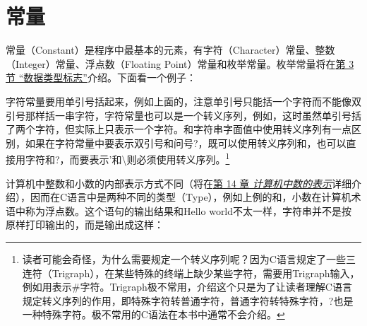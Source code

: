 
\section{常量}
%
常量（Constant）是程序中最基本的元素，有字符（Character）常量、整数（Integer）常量、浮点数（Floating Point）常量和枚举常量。枚举常量将在\hyperlink{db.ch07s03.id2731288}{第 3 节 “数据类型标志”}介绍。下面看一个例子：




字符常量要用单引号括起来，例如上面的，注意单引号只能括一个字符而不能像双引号那样括一串字符，字符常量也可以是一个转义序列，例如，这时虽然单引号括了两个字符，但实际上只表示一个字符。和字符串字面值中使用转义序列有一点区别，如果在字符常量中要表示双引号\BookQuoteChar{}和问号?，既可以使用转义序列\BookCode{\textbackslash{}\BookQuoteChar{}}和，也可以直接用字符\BookQuoteChar{}和?，而要表示'和\textbackslash{}则必须使用转义序列。\footnote[2]{读者可能会奇怪，为什么需要规定一个转义序列呢？因为C语言规定了一些三连符（Trigraph），在某些特殊的终端上缺少某些字符，需要用Trigraph输入，例如用表示\#字符。Trigraph极不常用，介绍这个只是为了让读者理解C语言规定转义序列的作用，即特殊字符转普通字符，普通字符转特殊字符，?也是一种特殊字符。极不常用的C语法在本书中通常不会介绍。}



计算机中整数和小数的内部表示方式不同（将在\hyperlink{db.ch14.id2752660}{第 14 章 \emph{计算机中数的表示}}详细介绍），因而在C语言中是两种不同的类型（Type），例如上例的和，小数在计算机术语中称为浮点数。这个语句的输出结果和Hello world不太一样，字符串并不是按原样打印输出的，而是输出成这样：




